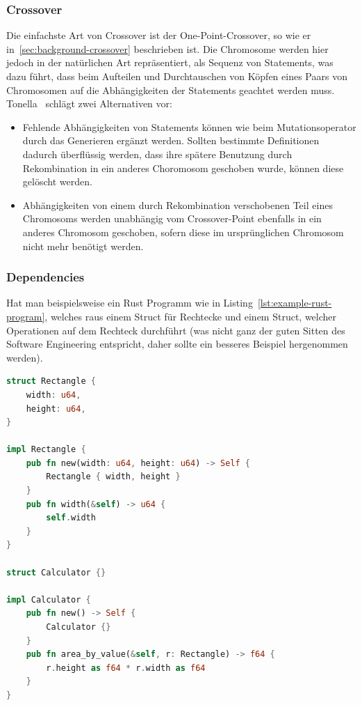\documentclass{article}
\begin{document}
\subsubsection{Crossover}
Die einfachste Art von Crossover ist der One-Point-Crossover, so wie er in~\cref{sec:background-crossover} beschrieben ist. Die Chromosome werden hier jedoch in der natürlichen Art repräsentiert, als Sequenz von Statements, was dazu führt, dass beim Aufteilen und Durchtauschen von Köpfen eines Paars von Chromosomen auf die Abhängigkeiten der Statements geachtet werden muss. Tonella~\cite{Tonella2004} schlägt zwei Alternativen vor:
\begin{itemize}
    \item Fehlende Abhängigkeiten von Statements können wie beim Mutationsoperator durch das Generieren ergänzt werden.  Sollten bestimmte Definitionen dadurch überflüssig werden, dass ihre spätere Benutzung durch Rekombination in ein anderes Choromosom geschoben wurde, können diese gelöscht werden. 
    \item Abhängigkeiten von einem durch Rekombination verschobenen Teil eines Chromosoms werden unabhängig vom Crossover-Point ebenfalls in ein anderes Chromosom geschoben, sofern diese im ursprünglichen Chromosom nicht mehr benötigt werden. 
\end{itemize}

\subsubsection{Dependencies}
Hat man beispielsweise ein Rust Programm wie in Listing~\ref{lst:example-rust-program}, welches raus einem Struct für Rechtecke und einem Struct, welcher Operationen auf dem Rechteck durchführt (was nicht ganz der guten Sitten des Software Engineering entspricht, daher sollte ein besseres Beispiel hergenommen werden). 

\begin{lstlisting}[language=Rust, style=boxed, caption=Ein Beispiel für ein Rust Program, label=lst:example-rust-program]
struct Rectangle {
    width: u64,
    height: u64,
}

impl Rectangle {
    pub fn new(width: u64, height: u64) -> Self {
        Rectangle { width, height }
    }
    pub fn width(&self) -> u64 {
        self.width
    }
}

struct Calculator {}

impl Calculator {
    pub fn new() -> Self {
        Calculator {}
    }
    pub fn area_by_value(&self, r: Rectangle) -> f64 {
        r.height as f64 * r.width as f64
    }
}
\end{lstlisting}
\end{document}
